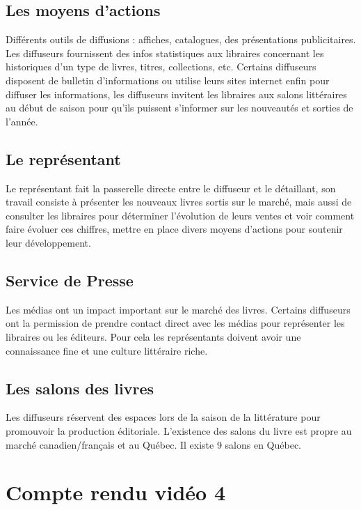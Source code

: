 \documentclass[a4paper, 13pt]{article}
\begin{document}
\subsection{Les moyens d’actions}
Différents outils de diffusions : affiches, catalogues, des présentations publicitaires.
Les diffuseurs fournissent des infos statistiques aux libraires concernant les historiques d’un type de livres, titres, collections, etc. Certains diffuseurs disposent de bulletin d’informations ou utilise leurs sites internet enfin pour diffuser les informations, les diffuseurs invitent les libraires aux salons littéraires au début de saison pour qu'ils puissent s'informer sur les nouveautés et sorties de l’année.
\subsection{Le représentant}
Le représentant fait la passerelle directe entre le diffuseur et le détaillant, son travail consiste à présenter les nouveaux livres sortis sur le marché, mais aussi de consulter les libraires pour déterminer l'évolution de leurs ventes et voir comment faire évoluer ces chiffres, mettre en place divers moyens d’actions pour soutenir leur développement.
\subsection{Service de Presse}
Les médias ont un impact important sur le marché des livres. Certains diffuseurs ont la permission de prendre contact direct avec les médias pour représenter les libraires ou les éditeurs. Pour cela les représentants doivent avoir une connaissance fine et une culture littéraire riche.
\subsection{Les salons des livres}
Les diffuseurs réservent des espaces lors de la saison de la littérature pour promouvoir la production éditoriale. L’existence des salons du livre est propre au marché canadien/français et au Québec.
Il existe 9 salons en Québec.
\section{Compte rendu vidéo 4}
\end{document}
